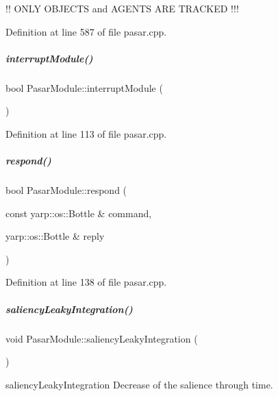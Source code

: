 !! O\+N\+LY O\+B\+J\+E\+C\+TS and A\+G\+E\+N\+TS A\+RE T\+R\+A\+C\+K\+ED !!! 

Definition at line 587 of file pasar.\+cpp.

\mbox{\label{group__pasar_a4eac5ebe37b69e5806561310bafb9698}} 
\subparagraph{\texorpdfstring{interrupt\+Module()}{interruptModule()}}
{\footnotesize\ttfamily bool Pasar\+Module\+::interrupt\+Module (\begin{DoxyParamCaption}{ }\end{DoxyParamCaption})}



Definition at line 113 of file pasar.\+cpp.

\mbox{\label{group__pasar_ae281b878aee48592dd4c2d75dcb44fa9}} 
\subparagraph{\texorpdfstring{respond()}{respond()}}
{\footnotesize\ttfamily bool Pasar\+Module\+::respond (\begin{DoxyParamCaption}\item[{const yarp\+::os\+::\+Bottle \&}]{command,  }\item[{yarp\+::os\+::\+Bottle \&}]{reply }\end{DoxyParamCaption})}



Definition at line 138 of file pasar.\+cpp.

\mbox{\label{group__pasar_af3892b35d0d3ee7cbc24a9db8d6709c7}} 
\subparagraph{\texorpdfstring{saliency\+Leaky\+Integration()}{saliencyLeakyIntegration()}}
{\footnotesize\ttfamily void Pasar\+Module\+::saliency\+Leaky\+Integration (\begin{DoxyParamCaption}{ }\end{DoxyParamCaption})\hspace{0.3cm}{\ttfamily [protected]}}



saliency\+Leaky\+Integration Decrease of the salience through time. 

